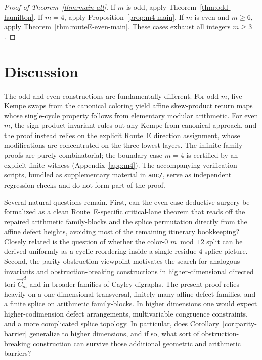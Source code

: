 \documentclass[11pt]{article}
\begin{document}
\begin{proof}[Proof of Theorem~\ref{thm:main-all}]
If $m$ is odd, apply Theorem~\ref{thm:odd-hamilton}.
If $m=4$, apply Proposition~\ref{prop:m4-main}.
If $m$ is even and $m\ge 6$, apply Theorem~\ref{thm:routeE-even-main}.
These cases exhaust all integers $m\ge 3$.
\end{proof}

\section{Discussion}\label{sec:discussion}

The odd and even constructions are fundamentally different.
For odd $m$, five Kempe swaps from the canonical coloring yield affine skew-product return maps whose single-cycle property follows from elementary modular arithmetic.
For even $m$, the sign-product invariant rules out any Kempe-from-canonical approach, and the proof instead relies on the explicit Route~E direction assignment, whose modifications are concentrated on the three lowest layers.
The infinite-family proofs are purely combinatorial; the boundary case $m=4$ is certified by an explicit finite witness (Appendix~\ref{app:m4}).
The accompanying verification scripts, bundled as supplementary material in \texttt{anc/}, serve as independent regression checks and do not form part of the proof.

Several natural questions remain.
First, can the even-case deductive surgery be formalized as a clean Route~E-specific critical-lane theorem that reads off the repaired arithmetic family-blocks and the splice permutation directly from the affine defect heights, avoiding most of the remaining itinerary bookkeeping?
Closely related is the question of whether the color-$0$ $m\bmod 12$ split can be derived uniformly as a cyclic reordering inside a single residue-$4$ splice picture.
Second, the parity-obstruction viewpoint motivates the search for analogous invariants and obstruction-breaking constructions in higher-dimensional directed tori $\vec C_m^{\,d}$ and in broader families of Cayley digraphs.
The present proof relies heavily on a one-dimensional transversal, finitely many affine defect families, and a finite splice on arithmetic family-blocks.
In higher dimensions one would expect higher-codimension defect arrangements, multivariable congruence constraints, and a more complicated splice topology.
In particular, does Corollary~\ref{cor:parity-barrier} generalize to higher dimensions, and if so, what sort of obstruction-breaking construction can survive those additional geometric and arithmetic barriers?
\end{document}
